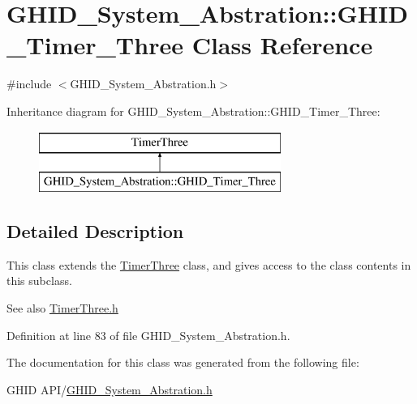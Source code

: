 \hypertarget{class_g_h_i_d___system___abstration_1_1_g_h_i_d___timer___three}{\section{\-G\-H\-I\-D\-\_\-\-System\-\_\-\-Abstration\-:\-:\-G\-H\-I\-D\-\_\-\-Timer\-\_\-\-Three \-Class \-Reference}
\label{class_g_h_i_d___system___abstration_1_1_g_h_i_d___timer___three}
}


{\ttfamily \#include $<$\-G\-H\-I\-D\-\_\-\-System\-\_\-\-Abstration.\-h$>$}

\-Inheritance diagram for \-G\-H\-I\-D\-\_\-\-System\-\_\-\-Abstration\-:\-:\-G\-H\-I\-D\-\_\-\-Timer\-\_\-\-Three\-:\begin{figure}[H]
\begin{center}
\leavevmode
\includegraphics[height=2.000000cm]{class_g_h_i_d___system___abstration_1_1_g_h_i_d___timer___three}
\end{center}
\end{figure}


\subsection{\-Detailed \-Description}
\-This class extends the \hyperlink{class_timer_three}{\-Timer\-Three} class, and gives access to the class contents in this subclass.

\begin{DoxySeeAlso}{\-See also}
\hyperlink{_timer_three_8h}{\-Timer\-Three.\-h} 
\end{DoxySeeAlso}


\-Definition at line 83 of file \-G\-H\-I\-D\-\_\-\-System\-\_\-\-Abstration.\-h.



\-The documentation for this class was generated from the following file\-:\begin{DoxyCompactItemize}
\item 
\-G\-H\-I\-D A\-P\-I/\hyperlink{_g_h_i_d___system___abstration_8h}{\-G\-H\-I\-D\-\_\-\-System\-\_\-\-Abstration.\-h}\end{DoxyCompactItemize}
